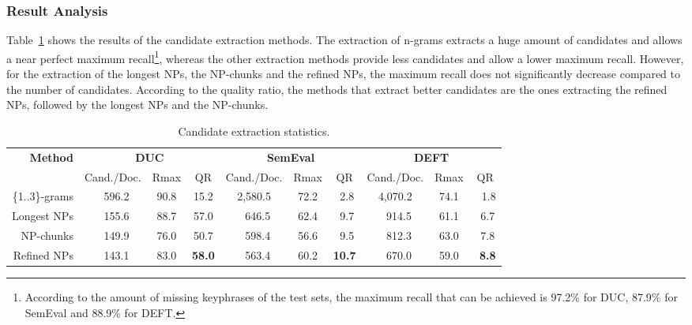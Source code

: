     \subsubsection{Result Analysis}
    \label{subsubsec:candidate_extraction_result_analysis}
      Table~\ref{tab:candidate_extraction_statistics} shows the results of the
      candidate extraction methods. The extraction  of n-grams extracts a huge
      amount of candidates and allows a near perfect maximum
      recall\footnote{According to the amount of missing keyphrases of the test
      sets, the maximum recall that can be achieved is 97.2\% for DUC, 87.9\%
      for SemEval and 88.9\% for DEFT.}, whereas the other extraction methods
      provide less candidates and allow a lower maximum recall. However, for the
      extraction of the longest NPs, the NP-chunks and the refined NPs, the
      maximum recall does not significantly decrease compared to the number of
      candidates. According to the quality ratio, the methods that extract
      better candidates are the ones extracting the refined NPs, followed by the
      longest NPs and the NP-chunks.%
      \begin{table}
        \centering
        \begin{tabular}{r@{~~}c@{~~}c@{~~}c@{~~}c@{~~}c@{~~}c@{~~}c@{~~}c@{~~}c}
          \toprule
          \multirow{2}{*}[-2pt]{\textbf{Method}} & \multicolumn{3}{c}{\textbf{DUC}} & \multicolumn{3}{c}{\textbf{SemEval}} & \multicolumn{3}{c}{\textbf{DEFT}}\\
          \cmidrule(r){2-4}\cmidrule(r){5-7}\cmidrule{8-10}
          & Cand./Doc. & Rmax & QR & Cand./Doc. & Rmax & QR & Cand./Doc. & Rmax & QR\\
          \midrule
          \{1..3\}-grams & $~~~$596.2 & 90.8 & 15.2 & 2,580.5 & 72.2 & $~~$2.8 & 4,070.2 & 74.1 & $~~~$1.8\\
          Longest NPs & $~~~$155.6 & 88.7 & 57.0 & $~~~$646.5 & 62.4 & $~~$9.7 & $~~~$914.5 & 61.1 & $~~$6.7\\
          NP-chunks & $~~~$149.9 & 76.0 & 50.7 & $~~~$598.4 & 56.6 & $~~$9.5 & $~~~$812.3 & 63.0 & $~~$7.8\\
          Refined NPs & $~~~$143.1 & 83.0 & \textbf{58.0} & $~~~$563.4 & 60.2 & \textbf{10.7} & $~~~$670.0 & 59.0 & \textbf{$~~$8.8}\\
          \bottomrule
        \end{tabular}
        \caption{Candidate extraction statistics.
                 \label{tab:candidate_extraction_statistics}}
      \end{table}
      
